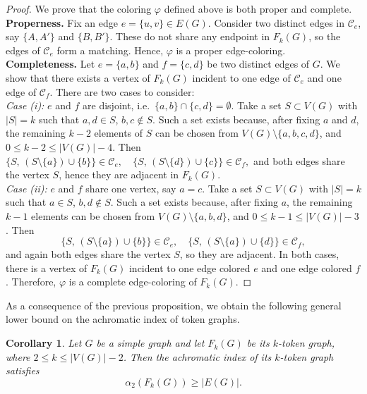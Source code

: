 \documentclass{article}
\newtheorem{corollary}[theorem]{Corollary}
\begin{document}
\begin{proof}
We prove that the coloring $\varphi$ defined above is both proper and complete.\\
\textbf{Properness.} Fix an edge $e=\{u,v\}\in E(G)$. 
Consider two distinct edges in $\mathcal{C}_e$, say $\{A,A'\}$ and $\{B,B'\}$. 
These do not share any endpoint in $F_k(G)$, so the edges of $\mathcal{C}_e$ form a matching. 
Hence, $\varphi$ is a proper edge-coloring. \\
\textbf{Completeness.} 
Let $e=\{a,b\}$ and $f=\{c,d\}$ be two distinct edges of $G$. 
We show that there exists a vertex of $F_k(G)$ incident to one edge of $\mathcal{C}_e$ and one edge of $\mathcal{C}_f$. 
There are two cases to consider:\\
\emph{Case (i):} $e$ and $f$ are disjoint, i.e.\ $\{a,b\} \cap \{c,d\} = \emptyset$.  
Take a set $S \subset V(G)$ with $|S|=k$ such that $a,d \in S$, $b,c \notin S$.  
Such a set exists because, after fixing $a$ and $d$, the remaining
$k-2$ elements of $S$ can be chosen from
$V(G)\setminus\{a,b,c,d\}$, and
$0\leq k-2\leq |V(G)|-4$.
Then $\{S,\, (S\setminus\{a\}) \cup \{b\}\} \in \mathcal{C}_e, 
\quad 
\{S,\, (S\setminus\{d\}) \cup \{c\}\} \in \mathcal{C}_f,$
and both edges share the vertex $S$, hence they are adjacent in $F_k(G)$. \\
\emph{Case (ii):} $e$ and $f$ share one vertex, say $a=c$.  
Take a set $S \subset V(G)$ with $|S|=k$ such that $a \in S$, $b,d \notin S$.  
Such a set exists because, after fixing $a$, the remaining $k-1$
elements can be chosen from $V(G)\setminus\{a,b,d\}$, and
$0\leq k-1\leq |V(G)|-3$.
Then
$$
\{S,\, (S\setminus\{a\}) \cup \{b\}\} \in \mathcal{C}_e, 
\quad 
\{S,\, (S\setminus\{a\}) \cup \{d\}\} \in \mathcal{C}_f,
$$
and again both edges share the vertex $S$, so they are adjacent.
In both cases, there is a vertex of $F_k(G)$ incident to one edge colored $e$ and one edge colored $f$. 
Therefore, $\varphi$ is a complete edge-coloring of $F_k(G)$.
\end{proof}

As a consequence of the previous proposition, we obtain the following general lower bound on the achromatic index of token graphs.

\begin{corollary}
Let $G$ be a simple graph and let $F_k(G)$ be its $k$-token graph, where $2 \le k \le |V(G)| - 2$. Then the achromatic index of its $k$-token graph satisfies
$$
\alpha_2(F_k(G)) \geq |E(G)|.
$$
\end{corollary}
\end{document}
